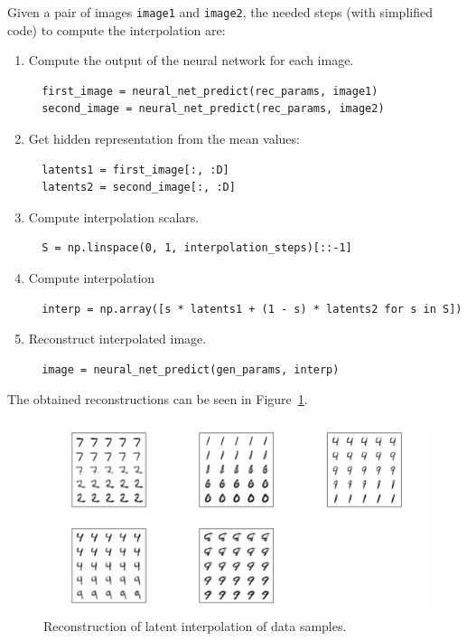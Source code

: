 \documentclass[11pt]{article}
\begin{document}
Given a pair of images \texttt{image1} and \texttt{image2}, the needed steps (with simplified code) to compute the interpolation are:
\begin{enumerate}
  \item Compute the output of the neural network for each image.
        \begin{verbatim}
  first_image = neural_net_predict(rec_params, image1)
  second_image = neural_net_predict(rec_params, image2)
\end{verbatim}
  \item Get hidden representation from the mean values:
        \begin{verbatim}
  latents1 = first_image[:, :D]
  latents2 = second_image[:, :D]
\end{verbatim}

  \item Compute interpolation scalars.
        \begin{verbatim}
  S = np.linspace(0, 1, interpolation_steps)[::-1]
\end{verbatim}
  \item Compute interpolation
        \begin{verbatim}
  interp = np.array([s * latents1 + (1 - s) * latents2 for s in S])
        \end{verbatim}
  \item Reconstruct interpolated image.
        \begin{verbatim}
  image = neural_net_predict(gen_params, interp)
          \end{verbatim}
\end{enumerate}

The obtained reconstructions can be seen in Figure~\ref{img:3.3}.
\begin{figure}[H]
  \centering
  \includegraphics[scale = 0.3]{imgs/interpolations.png}
  \caption{Reconstruction of latent interpolation of data samples.}\label{img:3.3}
\end{figure}
\end{document}
